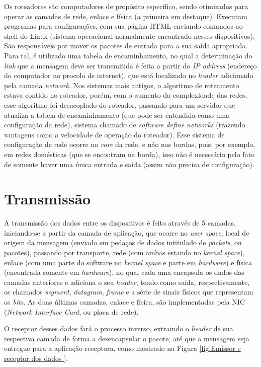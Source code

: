 Os roteadores são computadores de propósito específico, sendo otimizados
para operar as camadas de rede, enlace e física (a primeira em
destaque). Executam programas para configurações, com sua página HTML
enviando comandos ao shell do Linux (sistema operacional normalmente
encontrado nesses dispositivos). São responsáveis por mover os pacotes
de entrada para a sua saída apropriada. Para tal, é utilizado uma tabela
de encaminhamento, no qual a determinação do \emph{link} que a mensagem
deve ser transmitida é feita a partir do \emph{IP address} (endereço do
computador no procolo de internet), que está localizado no \emph{header}
adicionado pela camada \emph{network}. Nos sistemas mais antigos, o
algoritmo de roteamento estava contido no roteador, porém, com o aumento
da complexidade das redes, esse algoritmo foi desacoplado do roteador,
passando para um servidor que atualiza a tabela de encaminhamento (que
pode ser entendida como uma configuração da rede), sistema chamado de
\emph{software define networks} (trazendo vantagens como a velocidade de
operação do roteador). Esse sistema de configuração de rede ocorre no
\emph{core} da rede, e não nas bordas, pois, por exemplo, em redes
domésticas (que se encontram na borda), isso não é necessário pelo fato
de somente haver uma única entrada e saída (assim não precisa de
configuração).

\hypertarget{Transmissão}{%
\section{Transmissão}\label{transmissuxe3o}}

A transmissão dos dados entre os dispositivos é feito através de 5
camadas, iniciando-se a partir da camada de aplicação, que ocorre no
\emph{user space}, local de origem da mensagem (enviado em pedaços de
dados intitulado de \emph{packets}, ou pacotes), passando por transporte,
rede (com ambas estando no \emph{kernel space}), enlace (com uma parte
do software no \emph{kernel space} e parte em \emph{hardware}) e física
(encontrada somente em \emph{hardware}), no qual cada uma encapsula os
dados das camadas anteriores e adiciona o seu \emph{header}, tendo como
saída, respectivamente, os chamados \emph{segment}, \emph{datagram},
\emph{frame} e a série de sinais físicos que representam os \emph{bits}.
As duas últimas camadas, enlace e física, são implementadas pela NIC
(\emph{Network Interface Card}, ou placa de rede).

O receptor desses dados fará o processo inverso, extraindo o
\emph{header} de sua respectiva camada de forma a desencapsular o
pacote, até que a mensagem seja entregue para a aplicação receptora,
como mostrado na Figura \ref{fig:Emissor e receptor dos dados }.

